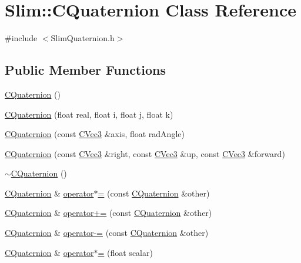 \hypertarget{class_slim_1_1_c_quaternion}{}\section{Slim\+:\+:C\+Quaternion Class Reference}
\label{class_slim_1_1_c_quaternion}


{\ttfamily \#include $<$Slim\+Quaternion.\+h$>$}

\subsection*{Public Member Functions}
\begin{DoxyCompactItemize}
\item 
\hyperlink{class_slim_1_1_c_quaternion_a6b203d70c2539992936e128f10af4943}{C\+Quaternion} ()
\item 
\hyperlink{class_slim_1_1_c_quaternion_a9930265285f9b59d6387de29a464c712}{C\+Quaternion} (float real, float i, float j, float k)
\item 
\hyperlink{class_slim_1_1_c_quaternion_a2a833ce7252f087b99fa0315bc759b26}{C\+Quaternion} (const \hyperlink{class_slim_1_1_c_vec3}{C\+Vec3} \&axis, float rad\+Angle)
\item 
\hyperlink{class_slim_1_1_c_quaternion_aeb67c425871d6eecc88bc8dc093cdee9}{C\+Quaternion} (const \hyperlink{class_slim_1_1_c_vec3}{C\+Vec3} \&right, const \hyperlink{class_slim_1_1_c_vec3}{C\+Vec3} \&up, const \hyperlink{class_slim_1_1_c_vec3}{C\+Vec3} \&forward)
\item 
\hyperlink{class_slim_1_1_c_quaternion_ab08702a7e44a32d8691ac69eb8f8d269}{$\sim$\+C\+Quaternion} ()
\item 
\hyperlink{class_slim_1_1_c_quaternion}{C\+Quaternion} \& \hyperlink{class_slim_1_1_c_quaternion_ad57ed86c8328d270abb32e514caf02ad}{operator$\ast$=} (const \hyperlink{class_slim_1_1_c_quaternion}{C\+Quaternion} \&other)
\item 
\hyperlink{class_slim_1_1_c_quaternion}{C\+Quaternion} \& \hyperlink{class_slim_1_1_c_quaternion_a2bf36f0b6e70af784d2aab92a0347c55}{operator+=} (const \hyperlink{class_slim_1_1_c_quaternion}{C\+Quaternion} \&other)
\item 
\hyperlink{class_slim_1_1_c_quaternion}{C\+Quaternion} \& \hyperlink{class_slim_1_1_c_quaternion_a0bcc8750ca86a96ed88d3f9818a0fe0d}{operator-\/=} (const \hyperlink{class_slim_1_1_c_quaternion}{C\+Quaternion} \&other)
\item 
\hyperlink{class_slim_1_1_c_quaternion}{C\+Quaternion} \& \hyperlink{class_slim_1_1_c_quaternion_aea1e5f6339e08df7c8fd45bc028a2ed0}{operator$\ast$=} (float scalar)

\end{DoxyCompactItemize}
